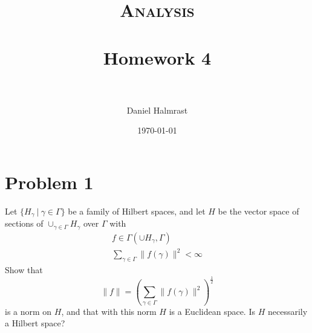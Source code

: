 \documentclass[fontsize=11pt]{scrartcl} %
\title{	
\normalfont \normalsize 
\textsc{Analysis} \\ [25pt] %
\horrule{0.5pt} \\[0.4cm] %
\huge Homework 4 \\ %
\horrule{2pt} \\[0.5cm] %
}
\author{Daniel Halmrast} %
\date{\normalsize\today} %
\numberwithin{equation}{section} %
\numberwithin{figure}{section} %
\numberwithin{table}{section} %
\begin{document}
\maketitle %

\section*{Problem 1}
Let $\{H_{\gamma}\ |\ \gamma\in\Gamma\}$ be a family of Hilbert spaces, and let
$H$ be the vector space of sections of $\cup_{\gamma\in\Gamma}H_{\gamma}$ over
$\Gamma$ with
\[
\begin{aligned}
    f\in \Gamma(\cup H_{\gamma},\Gamma)\\
    \sum_{\gamma\in\Gamma}\|f(\gamma)\|^2 < \infty
\end{aligned}
\]
Show that
\[
    \|f\| = \left( \sum_{\gamma\in\Gamma}\|f(\gamma)\|^2
    \right)^{\frac{1}{2}}
\]
is a norm on $H$, and that with this norm $H$ is a Euclidean space. Is $H$
necessarily a Hilbert space?
\\
\\
\end{document}
